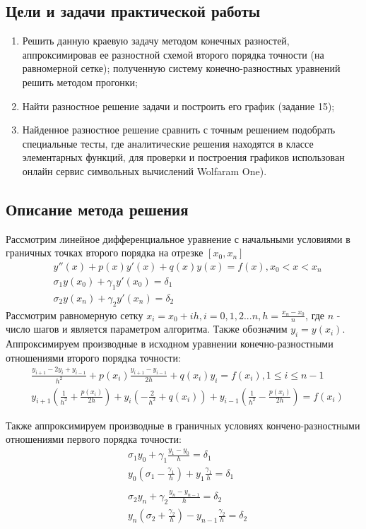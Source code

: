 \documentclass[a4paper,12pt,titlepage,finall]{article}
\begin{document}
\subsection{Цели и задачи практической работы}
\begin{enumerate}
\item
Решить данную краевую задачу методом конечных разностей, аппроксимировав ее разностной схемой второго порядка точности (на равномерной сетке); полученную систему конечно-разностных уравнений решить методом прогонки;
\item
Найти разностное решение задачи и построить его график (задание 15);
\item
Найденное разностное решение сравнить с точным решением
подобрать специальные тесты, где
аналитические решения находятся в классе элементарных функций, для проверки и построения графиков использован онлайн сервис символьных вычислений Wolfaram One).
\end{enumerate}

\newpage
\subsection{Описание метода решения}
Рассмотрим линейное дифференциальное уравнение с начальными условиями в граничных точках второго порядка на отрезке $[x_0, x_n]$
\begin{align*}
&y''(x) + p(x) y'(x) + q(x) y(x) = f(x), x_0 < x < x_n \\
&\sigma_1 y(x_0) + \gamma_1 y'(x_0) = \delta_1\\
&\sigma_2 y(x_n) + \gamma_2 y'(x_n) = \delta_2
\end{align*}
Рассмотрим равномерную сетку $x_i = x_0 + ih, i = 0, 1, 2 ... n, h = \frac{x_n - x_0}{n}$, где $n$ - число шагов и является параметром алгоритма. Также обозначим $y_i = y(x_i)$. Аппроксимируем производные в исходном уравнении конечно-разностными отношениями второго порядка точности:
\begin{align*}
&\frac{y_{i+1} - 2y_i + y_{i-1}}{h^2} + p(x_i) \frac{y_{i+1} - y_{i-1}}{2h} + q(x_i) y_i = f(x_i), 1 \leq i \leq n - 1\\
&y_{i+1} \left( \frac{1}{h^2} + \frac{p(x_i)}{2h} \right) + y_i \left( -\frac{2}{h^2} + q(x_i) \right) + y_{i-1} \left( \frac{1}{h^2} - \frac{p(x_i)}{2h} \right) = f(x_i)
\end{align*}

Также аппроксимируем производные в граничных условиях кончено-разностными отношениями первого порядка точности:
\begin{align*}
&\sigma_1 y_0 + \gamma_1 \frac{y_1 - y_0}{h} = \delta_1\\
&y_0 \left( \sigma_1  - \frac{\gamma_1}{h} \right) + y_1 \frac{\gamma_1}{h} = \delta_1\\
&\\
&\sigma_2 y_n + \gamma_2 \frac{y_n - y_{n-1}}{h} = \delta_2\\
&y_n \left( \sigma_2  + \frac{\gamma_2}{h} \right) - y_{n-1} \frac{\gamma_2}{h} = \delta_2
\end{align*}
\end{document}

